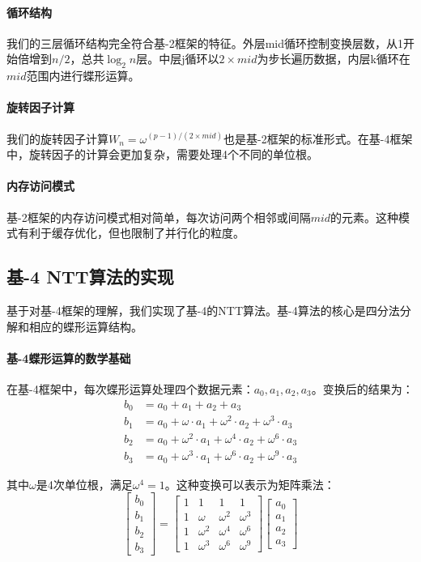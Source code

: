\documentclass[a4paper]{article}
\begin{document}
\paragraph{循环结构} 我们的三层循环结构完全符合基-2框架的特征。外层mid循环控制变换层数，从1开始倍增到$n/2$，总共$\log_2 n$层。中层j循环以$2 \times mid$为步长遍历数据，内层k循环在$mid$范围内进行蝶形运算。

\paragraph{旋转因子计算} 我们的旋转因子计算$W_n = \omega^{(p-1)/(2 \times mid)}$也是基-2框架的标准形式。在基-4框架中，旋转因子的计算会更加复杂，需要处理4个不同的单位根。

\paragraph{内存访问模式} 基-2框架的内存访问模式相对简单，每次访问两个相邻或间隔$mid$的元素。这种模式有利于缓存优化，但也限制了并行化的粒度。

\subsection{基-4 NTT算法的实现}

基于对基-4框架的理解，我们实现了基-4的NTT算法。基-4算法的核心是四分法分解和相应的蝶形运算结构。

\paragraph{基-4蝶形运算的数学基础} 在基-4框架中，每次蝶形运算处理四个数据元素：$a_0, a_1, a_2, a_3$。变换后的结果为：
\begin{align}
b_0 &= a_0 + a_1 + a_2 + a_3 \\
b_1 &= a_0 + \omega \cdot a_1 + \omega^2 \cdot a_2 + \omega^3 \cdot a_3 \\
b_2 &= a_0 + \omega^2 \cdot a_1 + \omega^4 \cdot a_2 + \omega^6 \cdot a_3 \\
b_3 &= a_0 + \omega^3 \cdot a_1 + \omega^6 \cdot a_2 + \omega^9 \cdot a_3
\end{align}

其中$\omega$是4次单位根，满足$\omega^4 = 1$。这种变换可以表示为矩阵乘法：
$$\begin{bmatrix} b_0 \\ b_1 \\ b_2 \\ b_3 \end{bmatrix} = 
\begin{bmatrix} 
1 & 1 & 1 & 1 \\
1 & \omega & \omega^2 & \omega^3 \\
1 & \omega^2 & \omega^4 & \omega^6 \\
1 & \omega^3 & \omega^6 & \omega^9
\end{bmatrix}
\begin{bmatrix} a_0 \\ a_1 \\ a_2 \\ a_3 \end{bmatrix}$$
\end{document}
